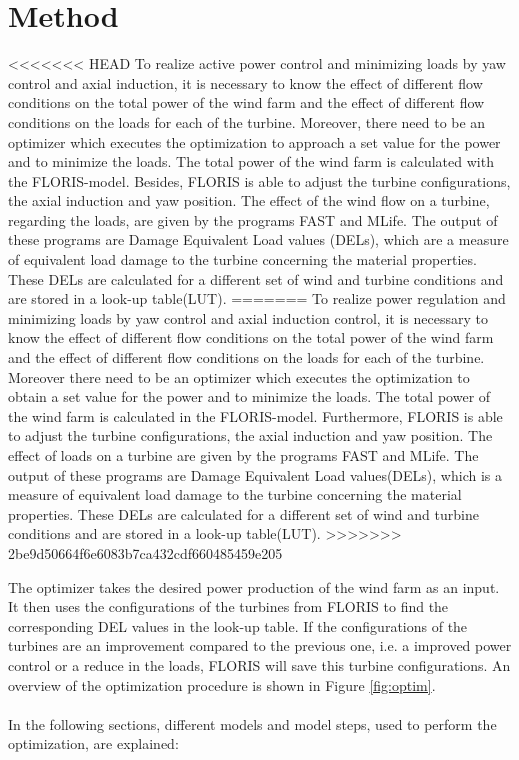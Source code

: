 \section{Method}
\label{sec:method}
	
<<<<<<< HEAD
	To realize active power control and minimizing loads by yaw control and axial induction, it is necessary to know the effect of different flow conditions on the total power of the wind farm and the effect of different flow conditions on the loads for each of the turbine. Moreover, there need to be an optimizer which executes the optimization to approach a set value for the power and to minimize the loads.\newline
	The total power of the wind farm is calculated with the FLORIS-model. Besides, FLORIS is able to adjust the turbine configurations, the axial induction and yaw position.  
	The effect of the wind flow on a turbine, regarding the loads, are given by the programs FAST and MLife. The output of these programs are Damage Equivalent Load values (DELs), which are a measure of equivalent load damage to the turbine concerning the material properties.\cite{Chougule2016} These DELs are calculated for a different set of wind and turbine conditions and are stored in a look-up table(LUT).
=======
	To realize power regulation and minimizing loads by yaw control and axial induction control, it is necessary to know the effect of different flow conditions on the total power of the wind farm and the effect of different flow conditions on the loads for each of the turbine. Moreover there need to be an optimizer which executes the optimization to obtain a set value for the power and to minimize the loads.\newline
	The total power of the wind farm is calculated in the FLORIS-model. Furthermore, FLORIS is able to adjust the turbine configurations, the axial induction and yaw position.  
	The effect of loads on a turbine are given by the programs FAST and MLife. The output of these programs are Damage Equivalent Load values(DELs), which is a measure of equivalent load damage to the turbine concerning the material properties.\cite{Chougule2016} These DELs are calculated for a different set of wind and turbine conditions and are stored in a look-up table(LUT).
>>>>>>> 2be9d50664f6e6083b7ca432cdf660485459e205
	
	The optimizer takes the desired power production of the wind farm as an input. It then uses the configurations of the turbines from FLORIS to find the corresponding DEL values in the look-up table. If the configurations of the turbines are an improvement compared to the previous one, i.e. a improved power control or a reduce in the loads, FLORIS will save this turbine configurations. An overview of the optimization procedure is shown in Figure \ref{fig:optim}. 
	\\
	\\
	In the following sections, different models and model steps, used to perform the optimization, are explained:
	
